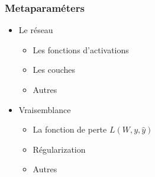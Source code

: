 \documentclass{beamer}
\begin{document}
\begin{frame}
	\frametitle{Metaparaméters}
	\begin{itemize}
		\item Le réseau
		\begin{itemize}
			\item Les fonctions d'activations
			\item Les couches
			\item Autres
		\end{itemize}
	\item Vraisemblance
	\begin{itemize}
		\item La fonction de perte $L(W, y, \hat y)$
		\item Régularization 
		\item Autres
	\end{itemize}
	\end{itemize}


\end{frame}
\end{document}
